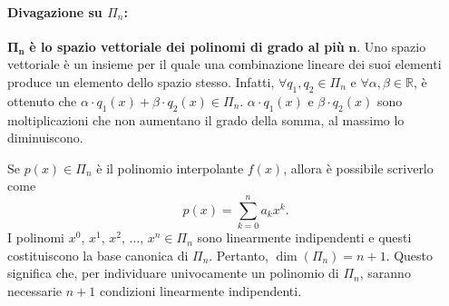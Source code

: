 \paragraph{Divagazione su $\Pi_n$:}{
$\boldsymbol{\Pi_n}$ \textbf{è lo spazio vettoriale dei polinomi di grado al più} $\boldsymbol n$. Uno spazio vettoriale è un insieme per il quale una combinazione lineare dei suoi elementi produce un elemento dello spazio stesso.
Infatti, $\forall q_1, q_2\in\Pi_n$ e $\forall \alpha,\beta\in\mathbb R$, è ottenuto che $\alpha \cdot q_1(x)+\beta\cdot q_2(x)\in\Pi_n$. $\alpha \cdot q_1(x)$ e $\beta\cdot q_2(x)$ sono moltiplicazioni che non aumentano il grado della somma, al massimo lo diminuiscono.

Se $p(x)\in\Pi_n$ è il polinomio interpolante $f(x)$, allora è possibile scriverlo come
\begin{equation}\label{eq:PolGenerico}
    p(x)=\sum_{k=0}^{n}a_kx^k.
\end{equation}
I polinomi $x^0,\, x^1,\, x^2,\, \hdots,\, x^n\in\Pi_n$ sono linearmente indipendenti e questi costituiscono la base canonica di $\Pi_n$. Pertanto, $\dim(\Pi_n)=n+1$. Questo significa che, per individuare univocamente un polinomio di $\Pi_n$,  saranno necessarie $n+1$ condizioni linearmente indipendenti.}

